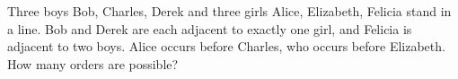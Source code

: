 Three boys Bob, Charles, Derek and three girls Alice, Elizabeth, Felicia stand in a line. Bob and Derek are each adjacent to exactly one girl, and Felicia is adjacent to two boys. Alice occurs before Charles, who occurs before Elizabeth. How many orders are possible?
